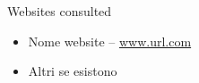 \cleardoublepage
{}
{}
\nocite{*}


%

\vspace{2.5cm}
\begin{Large}Websites consulted\end{Large}
\begin{itemize}
\item Nome website	-- \url{www.url.com}
\item Altri se esistono
\end{itemize}

